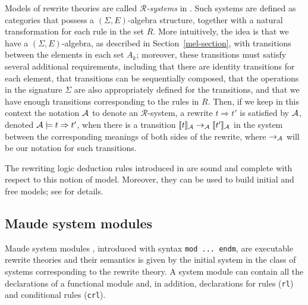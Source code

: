 Models of rewrite theories are called \emph{$\mathcal{R}$-systems}
in \cite{Meseguer92-tcs}.
Such systems are defined as categories that possess a
$(\Sigma,E)$-algebra structure, together with a natural transformation
for each rule in the set $R$. More intuitively, the idea is that we have a
$(\Sigma,E)$-algebra, as described in Section~\ref{mel-section}, with
transitions between the elements in each set $A_k$; moreover, these
transitions must satisfy several additional requirements, including that
there are identity transitions for each element, that transitions can
be sequentially composed, that the operations in the signature $\Sigma$
are also appropriately defined for the transitions, and that we have
enough transitions corresponding to the rules in $R$. Then, if we keep in
this context the notation $\mathcal{A}$ to denote an $\mathcal{R}$-system, a
rewrite $t \Rightarrow t'$ is satisfied by $\mathcal{A}$, 
denoted $\mathcal{A} \models t \Rightarrow t'$, when there is a transition
$[\![t]\!]_{\mathcal{A}} \rightarrow_{\mathcal{A}} [\![t']\!]_{\mathcal{A}}$ in the system between the
corresponding meanings of both sides of the rewrite, where $\rightarrow_{\mathcal{A}}$
will be our notation for such transitions. 

The rewriting logic deduction rules introduced in \cite{Meseguer92-tcs}
are sound and complete with respect to this notion of model. Moreover,
they can be used to build initial and free models; see \cite{Meseguer92-tcs}
for details.

\subsection{Maude system modules}

Maude system modules \cite[Chapter 6]{maude-book}, introduced with
syntax \texttt{mod ...\ endm}, are executable rewrite 
theories and their semantics is given by the initial system in the class of 
systems corresponding to the rewrite theory.  A system module can contain all the
declarations of a functional module and, in addition, declarations for
rules (\texttt{rl}) and conditional rules (\texttt{crl}).

